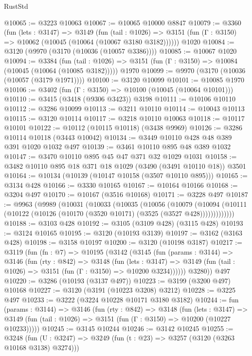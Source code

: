 \begin{lexlean}{RustStd}
\begin{coremodule}
@10065 := @3223 @10063
@10067 := @10065 @10000 @8847
@10079 := @3360
    (fun (lets : @3147) =>
    @3149
      (fun (tail : @1026) =>
      @3151 (fun (Γ : @3150) => @10062 (@10045 (@10064 (@10067 @3180 @3182))))))
    @1020
@10084 := @3120 (@9970 (@3170 (@10036 (@10057 @3386))))
@10085 := @10067 @1020
@10094 := @3384
    (fun (tail : @1026) => @3151 (fun (Γ : @3150) => @10084 (@10045 (@10064 (@10085 @3182)))))
    @1970
@10099 := @9970 (@3170 (@10036 (@10057 (@3179 @1971))))
@10100 := @3120 @10099
@10101 := @10085 @1970
@10106 := @3402 (fun (Γ : @3150) => @10100 (@10045 (@10064 @10101)))
@10110 := @3415 (@3418 (@9306 @3423)) @3198
@10111 := @10106 @10110
@10112 := @3286 @10099
@10113 := @3211 @10110
@10114 := @10043 @10113
@10115 := @3120 @10114
@10117 := @3218 @10110 @10063
@10118 := @10117 @10101
@10122 := @10112 (@10115 @10118) (@3438 @9969)
@10126 := @3286 @10114 @10118 (@3443 @10042)
@10134 := @3449 @10110 @428 @48 @389 @391 @1020 @1032 @497
@10139 := @3461 @10110 @895 @48 @389 @1032
@10147 := @3470 @10110 @895 @45 @47 @371 @32 @1029 @1031
@10158 := @3482 @10110 @895 @18 @371 @18 @1029 (@3490 (@3491 @10110 @18)) @3501
@10164 := @10134 (@10139 (@10147 @10158 (@3507 @10110 @895)))
@10165 := @3134 @428
@10166 := @3330 @10165
@10167 := @10164 @10166
@10168 := @3204 @497
@10170 := @10167 (@3516 @10168)
@10171 := @3228 @497
@10187 := @9963
    (@9989
      (@10031
        (@10033
          (@10035
            (@10056
              (@10079
                (@10094
                  (@10111 (@10122 (@10126 (@10170 (@3520 @10171) (@3525 (@3527 @428)))))))))))))
@10188 := @3103 @428
@10192 := @3105 (@3109 @428) (@3115 @428)
@10193 := @3124 @10165
@10195 := @3120 (@10193 @3139)
@10197 := @3162 (@3163 @428)
@10198 := @3158 @10197
@10200 := @3120 (@10198 @3187)
@10217 := @3119
    (fun (fn : @7) =>
    @10195
      (@3142
        (@3145
          (fun (params : @3144) =>
          @3146
            (fun (rty : @842) =>
            @3148
              (fun (lets : @3147) =>
              @3149 (fun (tail : @1026) => @3151 (fun (Γ : @3150) => @10200 @3234))))))
        @3280))
    @497
@10220 := @3286 (@10193 (@3137 @497))
@10223 := @3199 (@3200 @497) @10168
@10227 := @3120 (@3191 (@10223 @3208) @3212)
@10228 := @3225 @497
@10233 := @3222 (@3224 @10228 @10171 @3180 @3182)
@10244 := fun (params : @3144) =>
  @3146
    (fun (rty : @842) =>
    @3148
      (fun (lets : @3147) =>
      @3149 (fun (tail : @1026) => @3151 (fun (Γ : @3150) => @10200 (@10227 @10233)))))
@10245 := @3145 @10244
@10246 := @3142 @10245
@10255 := @3248
    (fun (U : @3247) => @3249 (fun (t : @23) => @3257 (@3120 (@3263 @10168 @3138) @3274)))

\end{coremodule}
\end{lexlean}
